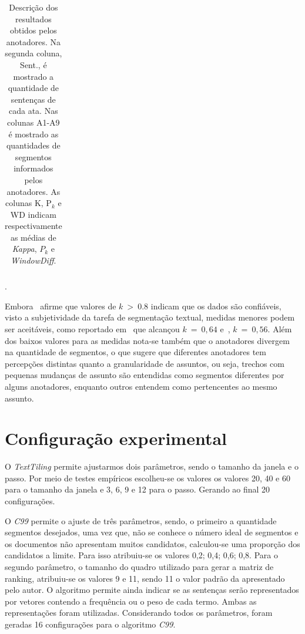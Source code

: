 \begin{table}[!h]
\begin{tabular}{|l|c|c|c|c|c|c|c|c|c|c|c|c|c|}
	\end{tabular}
	\caption{Descrição dos resultados obtidos pelos anotadores. Na segunda coluna, Sent., é mostrado a quantidade de sentenças de cada ata. Nas colunas A1-A9 é mostrado as quantidades de segmentos informados pelos anotadores. As colunas K, P$_k$ e WD indicam respectivamente as médias de \textit{Kappa}, $P_k$ e \textit{WindowDiff}.}. 

	\label{tab:ataseanotacoes}
\end{table}



Embora~\cite{Carletta1996} afirme que valores de $k~>~0.8$ indicam que os dados são confiáveis, visto a subjetividade da tarefa de segmentação textual, medidas menores podem ser aceitáveis, como reportado em~\cite{Hearst1997} que alcançou $k~=~0,64$ e~\cite{Cardoso2017}, $k~=~0,56$. Além dos baixos valores para as medidas nota-se também que o anotadores divergem na quantidade de segmentos, o que sugere que diferentes anotadores tem percepções distintas quanto a granularidade de assuntos, ou seja, trechos com pequenas mudanças de assunto são entendidas como segmentos diferentes por alguns anotadores, enquanto outros entendem como pertencentes ao mesmo assunto.





\section{Configuração experimental}
\label{subsec:configuracaoexperimental}

  

O \textit{TextTiling} permite ajustarmos dois parâmetros, sendo o tamanho da janela e o passo. Por meio de testes empíricos escolheu-se os valores os valores 20, 40 e 60 para o tamanho da janela e 3, 6, 9 e 12 para o passo. Gerando ao final 20 configurações.
%

O \textit{C99} permite o ajuste de três parâmetros, sendo, o primeiro a quantidade segmentos desejados, uma vez que, não se conhece o número ideal de segmentos e os documentos não apresentam muitos candidatos, calculou-se uma proporção dos candidatos a limite. Para isso atribuiu-se os valores {0,2; 0,4; 0,6; 0,8}. Para o segundo parâmetro, o tamanho do quadro utilizado para gerar a matriz de ranking, atribuiu-se os valores 9 e 11, sendo 11 o valor padrão da apresentado pelo autor. O algoritmo permite ainda indicar se as sentenças serão representados por vetores contendo a frequência ou o peso de cada termo. Ambas as representações foram utilizadas. Considerando todos os parâmetros, foram geradas 16 configurações para o algoritmo \textit{C99}.

